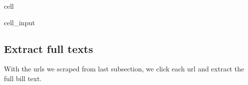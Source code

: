 \documentclass[letterpaper,10pt,english]{jupyterBook}
\begin{document}
\begin{sphinxuseclass}{cell}
\begin{sphinxVerbatimInput}
\begin{sphinxuseclass}{cell_input}
\begin{sphinxVerbatim}[commandchars=\\\{\}]
\end{sphinxVerbatim}

\end{sphinxuseclass}\end{sphinxVerbatimInput}

\end{sphinxuseclass}

\subsection{Extract full texts}
\label{\detokenize{ch7:extract-full-texts}}
\sphinxAtStartPar
With the urls we scraped from last subsection, we click each url and extract the full bill text.
\end{document}
